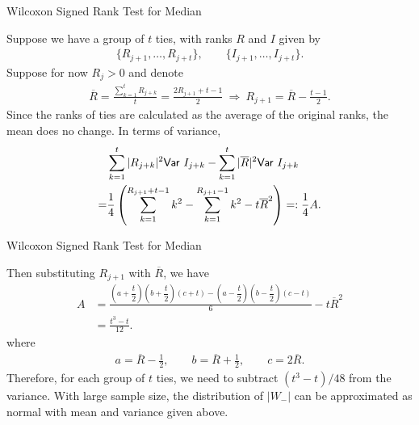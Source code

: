 \begin{frame}{Wilcoxon Signed Rank Test for Median}

\justifying
{} Suppose we have a group of $t$ ties, with ranks $R$ and $I$ given by
\begin{align*}
\{R_{j+1}, \ldots, R_{j+t} \}, \qquad \{I_{j+1}, \ldots, I_{j+t} \}.
\end{align*}
Suppose for now $R_j > 0$ and denote
\begin{align*}
\overline{R} = \frac{\sum_{k=1}^t R_{j+k} }{t} = \frac{2R_{j+1} + t - 1}{2} \ \Rightarrow\ R_{j+1} = \overline{R} - \frac{t-1}{2}.
\end{align*}
Since the ranks of ties are calculated as the average of the original ranks, the mean does no change. In terms of variance,
\begin{align*}
& \sum_{k=1}^t |R_{j+k}|^2 \mathsf{Var}\ I_{j+k}-\sum_{k=1}^t |\overline{R}|^2\mathsf{Var}\ I_{j+k} \\
= & \frac{1}{4}\left(\sum_{k=1}^{R_{j+1}+t-1} k^2 - \sum_{k=1}^{R_{j+1}-1}k^2 - t\overline{R}^2\right) =: \frac{1}{4}A.
\end{align*}

\end{frame}


\begin{frame}{Wilcoxon Signed Rank Test for Median}

\justifying
{} Then substituting $R_{j+1}$ with $\overline{R}$, we have
\begin{align*}
A & = \frac{\left(a + \dfrac{t}{2}\right)\left(b+\dfrac{t}{2} \right)\left(c + t \right) - \left(a-\dfrac{t}{2} \right)\left(b-\dfrac{t}{2} \right)\left(c-t \right)}{6} - t\overline{R}^2 \\
& = \frac{t^3 - t}{12}.
\end{align*}
where 
\begin{align*}
a = \overline{R} - \frac{1}{2}, \qquad b = \overline{R} + \frac{1}{2}, \qquad c = 2\overline{R}.
\end{align*}
Therefore, for each group of $t$ ties, we need to subtract $(t^3-t)/48$ from the variance. With large sample size, the distribution of $|W_-|$ can be approximated as normal with mean and variance given above. 

\end{frame}


